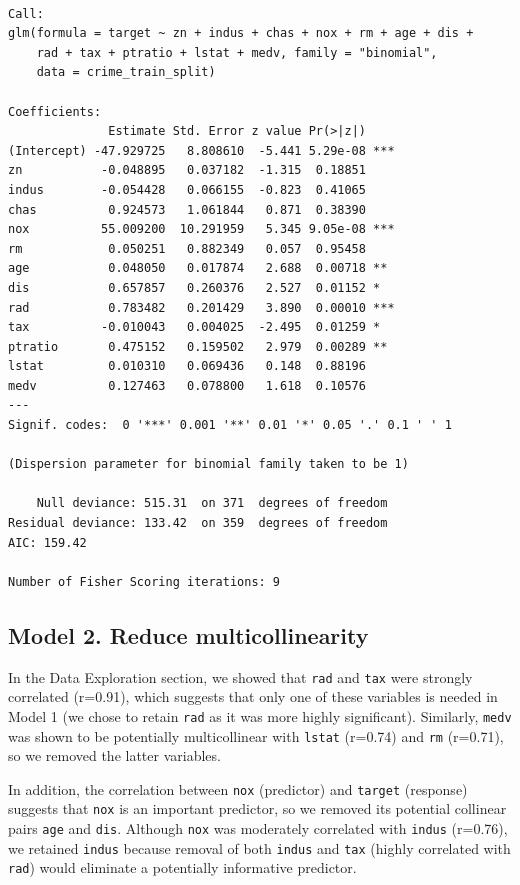 \documentclass[
  11pt]{article}
\begin{document}
\begin{verbatim}

Call:
glm(formula = target ~ zn + indus + chas + nox + rm + age + dis + 
    rad + tax + ptratio + lstat + medv, family = "binomial", 
    data = crime_train_split)

Coefficients:
              Estimate Std. Error z value Pr(>|z|)    
(Intercept) -47.929725   8.808610  -5.441 5.29e-08 ***
zn           -0.048895   0.037182  -1.315  0.18851    
indus        -0.054428   0.066155  -0.823  0.41065    
chas          0.924573   1.061844   0.871  0.38390    
nox          55.009200  10.291959   5.345 9.05e-08 ***
rm            0.050251   0.882349   0.057  0.95458    
age           0.048050   0.017874   2.688  0.00718 ** 
dis           0.657857   0.260376   2.527  0.01152 *  
rad           0.783482   0.201429   3.890  0.00010 ***
tax          -0.010043   0.004025  -2.495  0.01259 *  
ptratio       0.475152   0.159502   2.979  0.00289 ** 
lstat         0.010310   0.069436   0.148  0.88196    
medv          0.127463   0.078800   1.618  0.10576    
---
Signif. codes:  0 '***' 0.001 '**' 0.01 '*' 0.05 '.' 0.1 ' ' 1

(Dispersion parameter for binomial family taken to be 1)

    Null deviance: 515.31  on 371  degrees of freedom
Residual deviance: 133.42  on 359  degrees of freedom
AIC: 159.42

Number of Fisher Scoring iterations: 9
\end{verbatim}

\subsection{Model 2. Reduce
multicollinearity}\label{model-2.-reduce-multicollinearity}

In the Data Exploration section, we showed that \texttt{rad} and
\texttt{tax} were strongly correlated (r=0.91), which suggests that only
one of these variables is needed in Model 1 (we chose to retain
\texttt{rad} as it was more highly significant). Similarly,
\texttt{medv} was shown to be potentially multicollinear with
\texttt{lstat} (r=0.74) and \texttt{rm} (r=0.71), so we removed the
latter variables.

In addition, the correlation between \texttt{nox} (predictor) and
\texttt{target} (response) suggests that \texttt{nox} is an important
predictor, so we removed its potential collinear pairs \texttt{age} and
\texttt{dis}. Although \texttt{nox} was moderately correlated with
\texttt{indus} (r=0.76), we retained \texttt{indus} because removal of
both \texttt{indus} and \texttt{tax} (highly correlated with
\texttt{rad}) would eliminate a potentially informative predictor.
\end{document}
